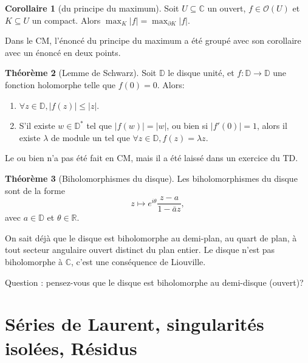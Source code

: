\documentclass[11pt,a4paper]{article}
\newcommand{\D}{\mathbb{D}}
\newcommand{\R}{\mathbb{R}}
\newcommand{\C}{\mathbb{C}}
\theoremstyle{definition}
\newtheorem{theoreme}{Th\'eor\`eme}[section]
\newtheorem{corollaire}[theoreme]{Corollaire}
\theoremstyle{plain}
\begin{document}
\begin{corollaire}[du principe du maximum]
Soit $U\subseteq \C$ un ouvert,  $f \in \mathcal O(U)$ et $K\subseteq U$ un compact.
Alors $\max_{K} |f| = \max_{\partial K} |f|$.
\end{corollaire}

\begin{remarque}
Dans le CM, l'énoncé du principe du maximum a été groupé avec son corollaire avec un énoncé en deux points.
\end{remarque}

\begin{theoreme}[Lemme de Schwarz]
Soit $\D$ le disque unité, et $f :\D\to \D$ une fonction holomorphe telle que $f(0)=0$.
Alors:
\begin{enumerate}
\item $\forall z\in \D, |f(z)|\leq |z|$.
\item S'il existe $w \in \D^*$ tel que $|f(w)|= |w|$, ou bien si $|f'(0)|=1$, alors il existe $\lambda$ de module un tel que $\forall z\in \D, f(z)=\lambda z$.
\end{enumerate}
\end{theoreme}

\begin{remarque}
Le \og ou bien\fg{} n'a pas été fait en CM, mais il a été laissé dans un exercice du TD.
\end{remarque}

\begin{theoreme}[Biholomorphismes du disque]
Les biholomorphismes du disque sont de la forme
\[ z\mapsto e^{i\theta}\frac{z-a}{1-\bar a z},\]
avec $a\in\D$ et $\theta\in\R$.
\end{theoreme}



\begin{remarque}
On sait déjà que le disque est biholomorphe au demi-plan, au quart de plan, à tout secteur angulaire ouvert distinct du plan entier. Le disque n'est pas biholomorphe à $\C$, c'est une conséquence de Liouville.
\end{remarque}

Question : pensez-vous que le disque est biholomorphe au demi-disque (ouvert)?





\section{Séries de Laurent, singularités isolées, Résidus}
\end{document}
